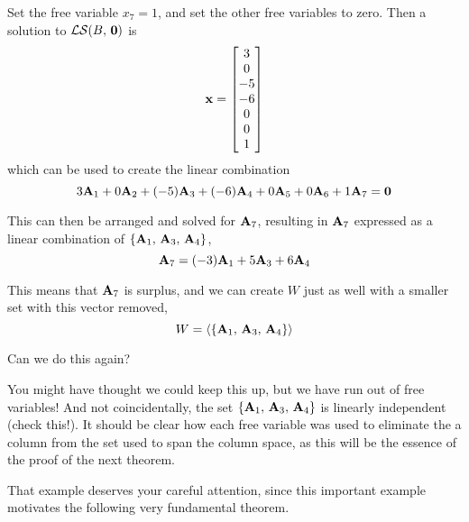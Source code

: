 \documentclass{ximera}
\begin{document}
\begin{example}
  Set the free variable $x_7=1$, and set the other free variables to
  zero.  Then a solution to $\mathcal{LS}\!\left(B,\,\mathbf{0}\right)$ is
  \[
    \mathbf{x}=\begin{bmatrix}3\\0\\-5\\-6\\0\\0\\1\end{bmatrix}
  \]
  which can be used to create the linear combination
  \[
    3\mathbf{A}_1+
    0\mathbf{A}_2+
    (-5)\mathbf{A}_3+
    (-6)\mathbf{A}_4+
    0\mathbf{A}_5+
    0\mathbf{A}_6+
    1\mathbf{A}_7
    =\mathbf{0}
  \]

  This can then be arranged and solved for $\mathbf{A}_7$, resulting in
  $\mathbf{A}_7$ expressed as a linear combination of
  $\left\{\mathbf{A}_1,\,\mathbf{A}_3,\,\mathbf{A}_4\right\}$,
  \[
    \mathbf{A}_7=
    (-3)\mathbf{A}_1+
    5\mathbf{A}_3+
    6\mathbf{A}_4
  \]

  This means that $\mathbf{A}_7$ is surplus, and we can create $W$ just
  as well with a smaller set with this vector removed,
  \[
    W=\left\langle\left\{\mathbf{A}_1,\,\mathbf{A}_3,\,\mathbf{A}_4\right\}\right\rangle
  \]

  \begin{question}
    Can we do this again?
    
    \begin{multipleChoice}
    \end{multipleChoice}

    \begin{feedback}[correct]
      You might have thought we could keep this up, but we have run out
      of free variables!  And not coincidentally, the set
      $\left\{\mathbf{A}_1,\,\mathbf{A}_3,\,\mathbf{A}_4\right\}$ is linearly
      independent (check this!).  It should be clear how each free
      variable was used to eliminate the a column from the set used to
      span the column space, as this will be the essence of the proof of
      the next theorem.
    \end{feedback}
  \end{question}
\end{example}

That example deserves your careful attention, since this important
example motivates the following very fundamental theorem.
\end{document}
